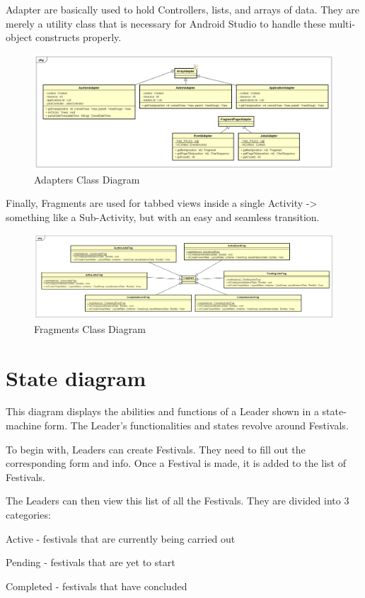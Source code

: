 Adapter are basically used to hold Controllers, lists, and arrays of data. They are merely a utility class that is necessary for Android Studio to handle these multi-object constructs properly.

\begin{figure}[H]
	\includegraphics[width=\linewidth]{diagrams/Adapters Class Diagram.png}
	\caption{Adapters Class Diagram}
	\label{fig:adapters_class_diag}
\end{figure}

Finally, Fragments are used for tabbed views inside a single Activity -> something like a Sub-Activity, but with an easy and seamless transition.

\begin{figure}[H]
	\includegraphics[width=\linewidth]{diagrams/Fragments Class Diagram.png}
	\caption{Fragments Class Diagram}
	\label{fig:fragments_class_diag}
\end{figure}

\section{State diagram}

This diagram displays the abilities and functions of a Leader shown in a state-machine form. The Leader's functionalities and states revolve around Festivals.

To begin with, Leaders can create Festivals. They need to fill out the corresponding form and info. Once a Festival is made, it is added to the list of Festivals.

The Leaders can then view this list of all the Festivals. They are divided into 3 categories:
\begin{packed_enum}
	\item Active - festivals that are currently being carried out
	\item Pending - festivals that are yet to start
	\item Completed - festivals that have concluded
\end{packed_enum}

